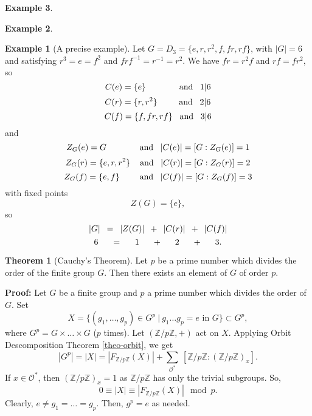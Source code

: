\documentclass[11pt]{amsbook}%
\theoremstyle{plain}
\theoremstyle{definition}
\newtheorem*{example*}{Example}
\newtheorem{theorem}{Theorem}
\numberwithin{equation}{section}
\newcommand{\ZZ}{\mathbb Z}
\newcommand{\OC}{\mathcal O}
\renewcommand{\proof}{ \textbf{Proof: }}
\begin{document}
\begin{example*}
\begin{example*}
\begin{example*}[A precise example]
  Let $G = D_{3} = \{e, r, r^{2}, f, fr, rf\}$, with $|G| = 6$ and satisfying $r^{3} = e = f^{2}$ and
  $frf^{-1} = r^{-1} = r^{2}$. We have $fr = r^{2}f$ and $rf = fr^{2}$, so
  $$
  C(e) = \{e\} \hspace{3.6em} \text{ and } \hspace{0.5em} 1|6
  $$
  $$
  C(r) = \{r, r^{2}\} \hspace{2.2em} \text{ and } \hspace{0.5em} 2|6
  $$
  $$
  C(f) = \{f, fr, rf\} \hspace{0.5em} \text{ and } \hspace{0.5em} 3|6
  $$
  and
  $$
  Z_{G}(e) = G \hspace{3.6em} \text{ and } \hspace{0.5em} |C(e)| = [G:Z_{G}(e)] = 1
  $$
  $$
  Z_{G}(r) = \{e, r, r^{2}\} \hspace{0.8em} \text{ and } \hspace{0.5em} |C(r)| = [G:Z_{G}(r)] = 2
  $$
  $$
  Z_{G}(f) = \{e, f\} \hspace{2em} \text{ and } \hspace{0.5em} |C(f)| = [G:Z_{G}(f)] = 3
  $$
  with fixed points
  $$
  Z(G) = \{e\},
  $$
  so
  $$
  |G| \hspace{0.5em} = \hspace{0.5em} |Z(G)| \hspace{0.5em} + \hspace{0.5em} |C(r)| \hspace{0.5em} + \hspace{0.5em} |C(f)|
  $$
  $$
  6 \hspace{1.5em} = \hspace{1.5em} 1 \hspace{1.5em} + \hspace{1.5em} 2 \hspace{1.5em} + \hspace{1.5em} 3.
  $$
\end{example*}

\begin{theorem}[Cauchy's Theorem]
  \label{theo-cauchy}
  Let $p$ be a prime number which divides the order of the finite group $G$. Then there exists
  an element of $G$ of order $p$.
\end{theorem} \vspace{1.8em}
\proof Let $G$ be a finite group and $p$ a prime number which divides the order of $G$. Set
$$
X = \{(g_{1}, \dots, g_{p}) \in G^{p} \ | \ g_{1} \dots g_{p} = e \text{ in } G\} \subset G^{p},
$$
where $G^{p} = G \times \dots \times G$ ($p$ times). Let $(\ZZ/p\ZZ, +)$ act on $X$.
Applying Orbit Descomposition Theorem \ref{theo-orbit}, we get
$$
|G^{p}| = |X| = |F_{\ZZ/p\ZZ}(X)| + \sum_{\OC^{*}} \ [\ZZ/p\ZZ:(\ZZ/p\ZZ)_{x}].
$$
If $x \in \OC^{*}$, then $(\ZZ/p\ZZ)_{x} = 1$ as $\ZZ/p\ZZ$ has only the trivial subgroups.
So,
$$
0 \equiv |X| \equiv |F_{\ZZ/p\ZZ}(X)| \mod p.
$$
Clearly, $e \neq g_{1} = \dots = g_{p}$. Then, $g^{p} = e$ as needed. \qedsymbol


\end{example*}
\end{example*}
\end{document}
